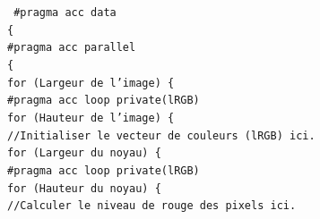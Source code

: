 \documentclass[11pt]{report}
\begin{document}
		\bigskip
		\begin{figure}[H]
			\noindent\texttt{
				\#pragma acc data\\
		        \{\\
		        \hspace*{1em}\#pragma acc parallel\\
		        \hspace*{1em}\{\\
		        \hspace*{1em}\hspace*{1em}for (Largeur de l'image) \{\\
		        \hspace*{1em}\hspace*{1em}\hspace*{1em}\#pragma acc loop private(lRGB)\\
		        \hspace*{1em}\hspace*{1em}\hspace*{1em}for (Hauteur de l'image) \{\\
				\hspace*{1em}\hspace*{1em}\hspace*{1em}\hspace*{1em}//Initialiser le vecteur de couleurs (lRGB) ici.\\       
		        \hspace*{1em}\hspace*{1em}\hspace*{1em}\hspace*{1em}for (Largeur du noyau) \{\\	
		        \hspace*{1em}\hspace*{1em}\hspace*{1em}\hspace*{1em}\hspace*{1em}\#pragma acc loop private(lRGB)\\
		        \hspace*{1em}\hspace*{1em}\hspace*{1em}\hspace*{1em}\hspace*{1em}for (Hauteur du noyau) \{\\
	            \hspace*{1em}\hspace*{1em}\hspace*{1em}\hspace*{1em}\hspace*{1em}\hspace*{1em}//Calculer le niveau de rouge des pixels ici.\\
}
\end{figure}
\end{document}
